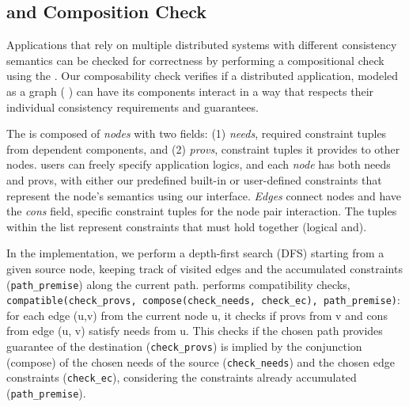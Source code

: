 \subsection{\sysgraph{} and Composition Check}
\label{subsec:search}

Applications that rely on multiple distributed systems with different
consistency semantics can be checked for correctness by performing a
compositional check using the \sysgraph{}.
Our composability check
verifies if a distributed application, modeled as a graph (\ie
\sysgraph{}) can have its components interact in a way that
respects their individual consistency requirements and guarantees.


The \sysgraph{} is composed of \textit{nodes} with two fields:
(1) \textit{needs}, required constraint tuples from dependent components, and
(2) \textit{provs}, constraint tuples it provides to other nodes.
\sysname{} users can freely specify application logics, and each \textit{node}
has both needs and provs, with either our predefined built-in
\sysmods{} or user-defined
constraints that represent the node's semantics using our interface.
\textit{Edges} connect nodes and have the \textit{cons} field,
specific constraint tuples for the node pair interaction.
The tuples within the list represent constraints that must hold together
(logical and).

In the implementation, we perform a depth-first search (DFS) starting from a
given source node, keeping track of visited edges and the accumulated
constraints (\texttt{path\_premise}) along the current path.
\sysname{} performs compatibility checks, \texttt{compatible(check\_provs,
compose(check\_needs, check\_ec), path\_premise)}:
for each edge (u,v) from the current node u, it checks if provs from v
and cons from edge (u, v) satisfy needs from u.
This checks if the chosen path provides guarantee of the destination
(\texttt{check\_provs}) is
implied by the conjunction (compose) of the chosen needs of the
source (\texttt{check\_needs}) and the chosen edge constraints
(\texttt{check\_ec}),
considering the constraints already accumulated (\texttt{path\_premise}).


